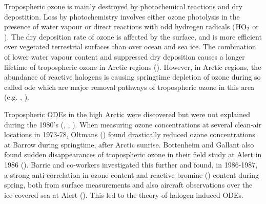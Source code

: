 \medskip




\medskip

Tropospheric ozone is mainly destroyed by photochemical reactions and dry depostition. Loss by photochemistry involves either ozone photolysis in the presence of water vapour or direct reactions with odd hydrogen radicals ($\mathrm{HO_2}$ or ). The dry deposition rate of ozone is affected by the surface, and is more efficient over vegetated terrestrial surfaces than over ocean and sea ice. The combination of lower water vapour content and suppressed dry deposition causes a longer lifetime of tropospheric ozone in Arctic regions (\cite{AMAP2015}). However, in Arctic regions, the abundance of reactive halogens is causing springtime depletion of ozone during so called \acrfull{ode}  which are major removal pathways of tropospheric ozone in this area (e.g. \cite{Simpson2015}, \cite{AMAP2015}).

\medskip

Tropospheric ODEs in the high Arctic were discovered but were not explained during the 1980's (\cite{Oltmans1981}, \cite{oltmans1986surface}, \cite{bottenheim1986measurements}). When measuring ozone concentrations at several clean-air locations in 1973-78, Oltmans (\cite{Oltmans1981}) found drastically reduced ozone concentrations at Barrow during springtime, after Arctic sunrise. Bottenheim and Gallant also found sudden disappearances of tropospheric ozone in their field study at Alert in 1986 (\cite{bottenheim1986measurements}). Barrie and co-workers investigated this further and found, in 1986-1987, a strong anti-correlation in ozone content and reactive bromine () content during spring, both from surface measurements and also aircraft observations over the ice-covered sea at Alert (\cite{barrie}). This led to the theory of halogen induced ODEs. 

